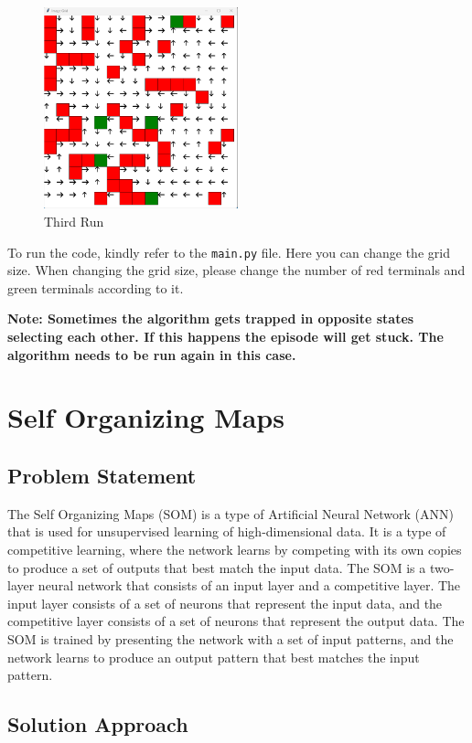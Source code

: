 \documentclass{article}
\begin{document}
\begin{figure}[H]
  \centering
  \includegraphics[width=0.5\textwidth, height=0.3\textheight]{images/grid_3.png}
  \caption{Third Run}
\end{figure}

To run the code, kindly refer to the \texttt{main.py} file. Here you can change the grid size. When changing the grid size, please change the number of red terminals and green terminals according to it. 

\textbf{Note: Sometimes the algorithm gets trapped in opposite states selecting each other. If this happens the episode will get stuck. The algorithm needs to be run again in this case.}

\section{Self Organizing Maps}

\subsection{Problem Statement}
The Self Organizing Maps (SOM) is a type of Artificial Neural Network (ANN) that is used for unsupervised learning of high-dimensional data. It is a type of competitive learning, where the network learns by competing with its own copies to produce a set of outputs that best match the input data.
The SOM is a two-layer neural network that consists of an input layer and a competitive layer. The input layer consists of a set of neurons that represent the input data, and the competitive layer consists of a set of neurons that represent the output data. The SOM is trained by presenting the network with a set of input patterns, and the network learns to produce an output pattern that best matches the input pattern.

\subsection{Solution Approach}
\end{document}
